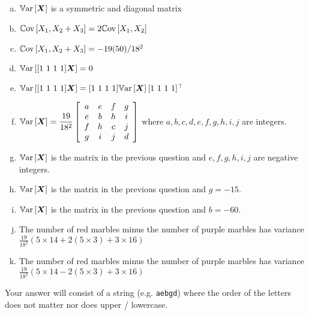 \documentclass[12pt,landscape]{article}
\newcommand{\instr}{\small Your answer will consist of a string (e.g. \texttt{aebgd}) where the order of the letters does not matter nor does upper / lowercase. \normalsize}
\begin{document}
\begin{enumerate}[(a)]
\item $\mathbb{V}\text{ar}\left[\boldsymbol{X}\right]$ is a symmetric and diagonal matrix
\item $\mathbb{C}\text{ov}\left[X_1, X_2 + X_3\right] = 2\mathbb{C}\text{ov}\left[X_1, X_2\right]$
\item $\mathbb{C}\text{ov}\left[X_1, X_2 + X_3\right] = -19 (50) / 18^2$
\item $\mathbb{V}\text{ar}\left[[1~1~1~1] \boldsymbol{X}\right] = 0$
\item $\mathbb{V}\text{ar}\left[[1~1~1~1] \boldsymbol{X}\right] = [1~1~1~1] \mathbb{V}\text{ar}\left[\boldsymbol{X}\right] [1~1~1~1]^\top$
\item $\mathbb{V}\text{ar}\left[\boldsymbol{X}\right] = \displaystyle\frac{19}{18^2}\left[\begin{array}{cccc} 
a & e & f & g \\
e & b & h & i \\
f & h & c & j \\
g & i & j & d
\end{array}\right]$ where $a, b, c, d, e, f, g, h, i, j$ are integers.
\item $\mathbb{V}\text{ar}\left[\boldsymbol{X}\right]$ is the matrix in the previous question and $e, f, g, h, i, j$ are negative integers.
\item $\mathbb{V}\text{ar}\left[\boldsymbol{X}\right]$ is the matrix in the previous question and $g = -15$.
\item $\mathbb{V}\text{ar}\left[\boldsymbol{X}\right]$ is the matrix in the previous question and $b = -60$.
\item The number of red marbles minus the number of purple marbles has variance $\frac{19}{18^2}(5 \times 14 + 2 (5 \times 3) + 3 \times 16)$
\item The number of red marbles minus the number of purple marbles has variance $\frac{19}{18^2}(5 \times 14 - 2 (5 \times 3) + 3 \times 16)$
\end{enumerate}
\eenum\instr\pagebreak

\end{document}
